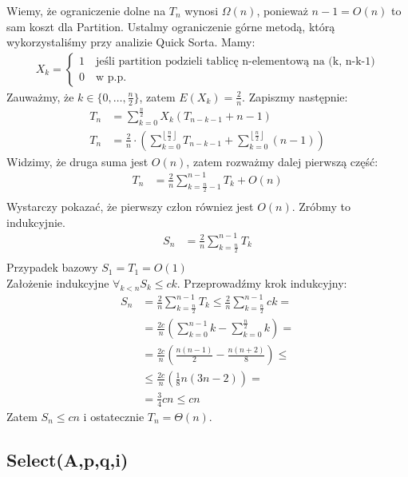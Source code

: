 \documentclass{article}
\numberwithin{equation}{subsection}
\begin{document}
\noindent
Wiemy, że ograniczenie dolne na $T_n$ wynosi $\Omega(n)$, ponieważ $n-1=O(n)$ to sam koszt dla Partition.
Ustalmy ograniczenie górne metodą, którą wykorzystaliśmy przy analizie Quick Sorta. Mamy:
\begin{align}
    X_k = \begin{cases}
        1 \quad \text{jeśli partition podzieli tablicę n-elementową na (k, n-k-1)}\\
        0 \quad \text{w p.p.}
    \end{cases}
\end{align}
Zauważmy, że $k\in \{0,\dots,\frac{n}{2}\}$, zatem $E(X_k) = \frac{2}{n}$. Zapiszmy następnie:
\begin{align}
    T_n &= \sum_{k=0}^{\frac{n}{2}} X_k \left(T_{n-k-1} + n-1\right)\\
    T_n &= \frac{2}{n} \cdot \left(\sum_{k=0}^{\left\lfloor \frac{n}{2} \right\rfloor} T_{n-k-1} + \sum_{k=0}^{\left\lfloor \frac{n}{2} \right\rfloor} (n-1)\right)
\end{align}
Widzimy, że druga suma jest $O(n)$, zatem rozważmy dalej pierwszą część:
\begin{align}
    T_n &= \frac{2}{n} \sum_{k=\frac{n}{2}-1}^{n-1} T_k + O(n)\\
\end{align}
Wystarczy pokazać, że pierwszy człon równiez jest $O(n)$. Zróbmy to indukcyjnie.
\begin{align}
    S_n &= \frac{2}{n} \sum_{k=\frac{n}{2}}^{n-1} T_k\\
\end{align}
Przypadek bazowy $S_1 = T_1 = O(1)$\\
Założenie indukcyjne $\forall_{k<n} S_k \leq ck$. Przeprowadźmy krok indukcyjny:
\begin{align}
    S_n &= \frac{2}{n} \sum_{k=\frac{n}{2}}^{n-1} T_k \leq \frac{2}{n} \sum_{k=\frac{n}{2}}^{n-1} ck =\\
    &= \frac{2c}{n} \left(\sum_{k=0}^{n-1} k - \sum_{k=0}^{\frac{n}{2}} k\right) =\\
    &= \frac{2c}{n} \left(\frac{n(n-1)}{2} - \frac{n(n+2)}{8} \right) \leq\\
    &\leq \frac{2c}{n} \left(\frac{1}{8} n (3n-2)\right) =\\
    &= \frac{3}{4}cn \leq cn
\end{align}
Zatem $S_n \leq cn$ i ostatecznie $T_n = \Theta(n)$.

\subsection{Select(A,p,q,i)}
\end{document}
